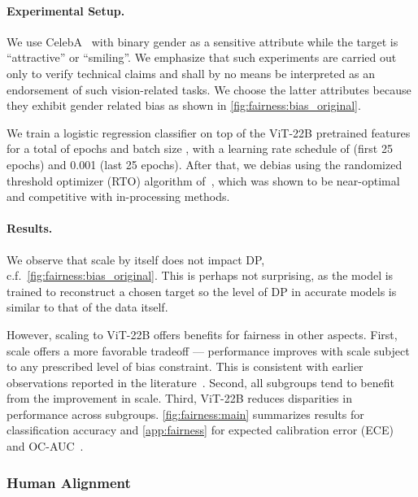 \documentclass{article}
\newcommand{\chonk}{\mbox{ViT-22B}\xspace}
\begin{document}
\paragraph{Experimental Setup.} We use CelebA~\citep{liu2015faceattributes} with binary gender as a sensitive attribute while the target is  ``attractive'' or ``smiling''. We emphasize that such experiments are carried out only to verify technical claims and shall by no means be interpreted as an endorsement of such vision-related tasks. We choose the latter attributes because they exhibit gender related bias as shown in \cref{fig:fairness:bias_original}.

We train a logistic regression classifier on top of the \chonk pretrained features for a total of  epochs and batch size , with a learning rate schedule of  (first 25 epochs) and 0.001 (last 25 epochs).  After that, we debias using the randomized threshold optimizer (RTO) algorithm of~\citet{alabdulmohsin2021}, which was shown to be near-optimal and competitive with in-processing methods. 

\paragraph{Results.}
We observe that scale by itself does not impact DP, c.f.\ \cref{fig:fairness:bias_original}. This is perhaps not surprising, as the model is trained to reconstruct a chosen target so the level of DP in accurate models is similar to that of the data itself.

However, scaling to \chonk offers benefits for fairness in other aspects. First, scale offers a more favorable tradeoff ---  performance improves with scale subject to any prescribed level of bias constraint.
This is consistent with earlier observations reported in the literature~\citep{alabdulmohsin2021}.  Second, all subgroups tend to benefit from the improvement in scale. Third, \chonk reduces disparities in performance across subgroups. 
\cref{fig:fairness:main} summarizes results for classification accuracy and \cref{app:fairness} for expected calibration error (ECE)~\citep{naeini2015obtaining,guo2017calibration} and OC-AUC~\citep{kivlichan2021measuring}.



\subsubsection{Human Alignment}
\label{subsec:error consistency}
\end{document}
